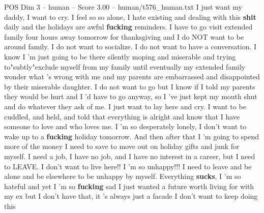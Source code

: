 \begin{textsample}{POS Dim 3 – human – Score 3.00 – human/t576\_human.txt}  \label{ex:f3_pos_013}
I just want my daddy, I want to cry.
I feel so so alone, I hate existing and dealing with this \textbf{shit} daily and the holidays are awful \textbf{fucking} reminders.
I have to go visit extended family four hours away tomorrow for thanksgiving and I do NOT want to be around family.
I do not want to socialize.
I do not want to have a conversation.
I know I 'm just going to be there silently moping and miserable and trying to"subtly"exclude myself from my family until eventually my extended family wonder what ’s wrong with me and my parents are embarrassed and disappointed by their miserable daughter.
I do not want to go but I know if I told my parents they would be hurt and I 'd have to go anyway, so I 've just kept my mouth shut and do whatever they ask of me.
I just want to lay here and cry.
I want to be cuddled, and held, and told that everything is alright and know that I have someone to love and who loves me.
I 'm so desperately lonely, I don't want to wake up to a \textbf{fucking} holiday tomorrow.
And then after that I 'm going to spend more of the money I need to save to move out on holiday gifts and junk for myself.
I need a job, I have no job, and I have no interest in a career, but I need to LEAVE.
I don't want to live here!!
I 'm so unhappy!!!
I need to leave and be alone and be elsewhere to be unhappy by myself.
Everything \textbf{sucks}, I 'm so hateful and yet I 'm so \textbf{fucking} sad I just wanted a future worth living for with my ex but I don't have that, it 's always just a facade I don't want to keep doing this

\end{textsample}
